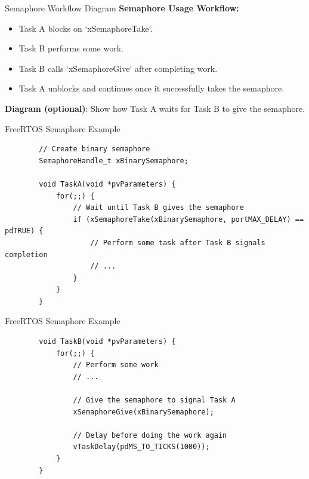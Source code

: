 \documentclass[10pt]{beamer}
\begin{document}
\begin{frame}{Semaphore Workflow Diagram}
    \textbf{Semaphore Usage Workflow:}
    \vspace{0.3cm}
    
    \begin{itemize}
        \item Task A blocks on `xSemaphoreTake`.
        \item Task B performs some work.
        \item Task B calls `xSemaphoreGive` after completing work.
        \item Task A unblocks and continues once it successfully takes the semaphore.
    \end{itemize}
    
    \vspace{0.5cm}
    
    \textbf{Diagram (optional)}: Show how Task A waits for Task B to give the semaphore.
    
\end{frame}


\begin{frame}[fragile]{FreeRTOS Semaphore Example}
    \begin{lstlisting}
        // Create binary semaphore
        SemaphoreHandle_t xBinarySemaphore;
        
        void TaskA(void *pvParameters) {
            for(;;) {
                // Wait until Task B gives the semaphore
                if (xSemaphoreTake(xBinarySemaphore, portMAX_DELAY) == pdTRUE) {
                    // Perform some task after Task B signals completion
                    // ...
                }
            }
        }
    \end{lstlisting}
\end{frame}

\begin{frame}[fragile]{FreeRTOS Semaphore Example}
    \begin{lstlisting}
        void TaskB(void *pvParameters) {
            for(;;) {
                // Perform some work
                // ...
        
                // Give the semaphore to signal Task A
                xSemaphoreGive(xBinarySemaphore);
        
                // Delay before doing the work again
                vTaskDelay(pdMS_TO_TICKS(1000));
            }
        }
    \end{lstlisting}
\end{frame}
\end{document}
